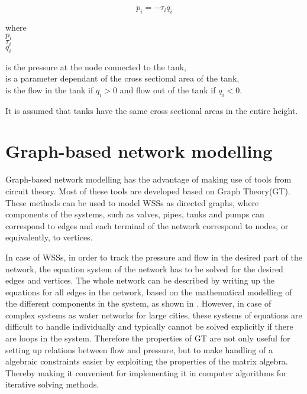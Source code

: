 \begin{equation}
\label{wt_model}
\dot{p}_i = -\tau_i q_i
\end{equation}

 \begin{minipage}[t]{0.20\textwidth}
where\\
\hspace*{8mm} $p_i$ \\
\hspace*{8mm} $\tau_i$ \\
\newline
\hspace*{8mm} $q_i$ 
\end{minipage}
\begin{minipage}[t]{0.68\textwidth}
\vspace*{2mm}
is the pressure at the node connected to the tank,\\ 
is a parameter dependant of the cross sectional area of the tank,\\
is the flow in the tank if $q_i > 0$ and flow out of the tank if $q_i < 0$.
\end{minipage}

It is assumed that tanks have the same cross sectional areas in the entire height. 

\section{Graph-based network modelling}
\label{graph_based_network_modelling}

Graph-based network modelling has the advantage of making use of tools from circuit theory. Most of these tools are developed based on Graph Theory(GT). These methods can be used to model WSSs as directed graphs, where components of the systems, such as valves, pipes, tanks and pumps can correspond to edges and each terminal of the network correspond to nodes, or equivalently, to vertices.

In case of WSSs, in order to track the pressure and flow in the desired part of the network, the equation system of the network has to be solved for the desired edges and vertices. The whole network can be described by writing up the equations for all edges in the network, based on the mathematical modelling of the different components in the system, as shown in . However, in case of complex systems as water networks for large cities, these systems of equations are difficult to handle individually and typically cannot be solved explicitly if there are loops in the system. Therefore the properties of GT are not only useful for setting up relations between flow and pressure, but to make handling of a algebraic constraints easier by exploiting the properties of the matrix algebra. Thereby making it convenient for implementing it in computer algorithms for iterative solving methods.  

